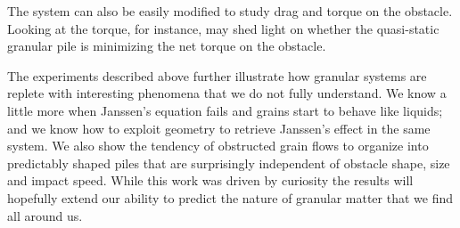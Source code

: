 The system can also be easily modified to study drag and torque on the obstacle. Looking at the torque, for instance, may shed light on whether the quasi-static granular pile is minimizing the net torque on the obstacle.


The experiments described above further illustrate how granular systems are replete with interesting phenomena that we do not fully understand. We know a little more when Janssen's equation fails and grains start to behave like liquids; and we know how to exploit geometry to retrieve Janssen's effect in the same system. We also show the tendency of obstructed grain flows to organize into predictably shaped piles that are surprisingly independent of obstacle shape, size and impact speed. While this work was driven by curiosity the results will hopefully extend our ability to predict the nature of granular matter that we find all around us. 